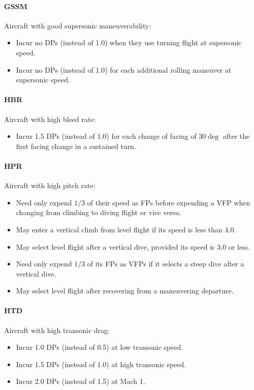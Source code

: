\documentclass[10pt]{article}
\begin{document}
\paragraph{GSSM} Aircraft with good supersonic maneuverability:
\begin{itemize}
    \item Incur no DPs (instead of 1.0) when they use turning flight at supersonic speed.
    \item Incur no DPs (instead of 1.0) for each additional rolling maneuver at supersonic speed.
\end{itemize}

\paragraph{HBR} Aircraft with high bleed rate:
\begin{itemize}
    \item Incur 1.5 DPs (instead of 1.0) for each change of facing of $30\deg$ after the first facing change in a sustained turn.
\end{itemize}

\paragraph{HPR} Aircraft with high pitch rate:
\begin{itemize}
    \item Need only expend $1/3$ of their speed as FPs before expending a VFP when changing from climbing to diving flight or vice versa.
    \item May enter a vertical climb from level flight if its speed is less than 4.0.
    \item May select level flight after a vertical dive, provided its speed is 3.0 or less.
    \item Need only expend $1/3$ of its FPs as VFPs if it selects a steep dive after a vertical dive.
    \item May select level flight after recovering from a maneuvering departure.
\end{itemize}

\paragraph{HTD} Aircraft with high transonic drag:
\begin{itemize}
    \item Incur 1.0 DPs (instead of 0.5) at low transonic speed.
    \item Incur 1.5 DPs (instead of 1.0) at high transonic speed.
    \item Incur 2.0 DPs (instead of 1.5) at Mach 1.
\end{itemize}
\end{document}
